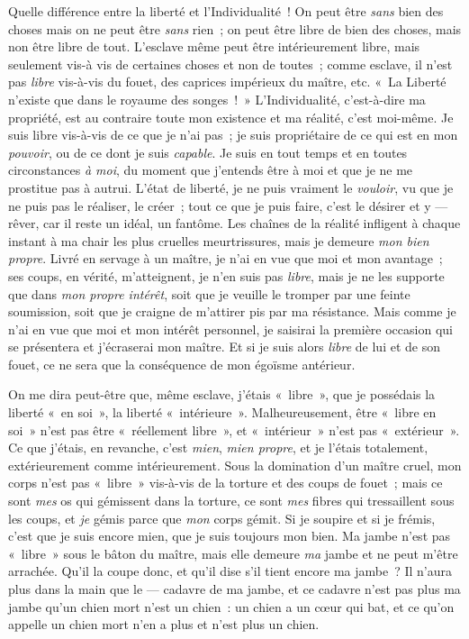 \documentclass[french,twoside]{book} %
\begin{document}
Quelle différence entre la liberté et l’Individualité ! On peut être \emph{sans} bien des choses mais on ne peut être \emph{sans} rien ; on peut être libre de bien des choses,  mais non être libre de tout. L’esclave même peut être intérieurement libre, mais seulement vis-à vis de certaines choses et non de toutes ; comme esclave, il n’est pas \emph{libre} vis-à-vis du fouet, des caprices impérieux du maître, etc. « La Liberté n’existe que dans le royaume des songes ! » L’Individualité, c’est-à-dire ma propriété, est au contraire toute mon existence et ma réalité, c’est moi-même. Je suis libre vis-à-vis de ce que je n’ai pas ; je suis propriétaire de ce qui est en mon \emph{pouvoir}, ou de ce dont je suis \emph{capable}. Je suis en tout temps et en toutes circonstances \emph{à moi}, du moment que j’entends être à moi et que je ne me prostitue pas à autrui. L’état de liberté, je ne puis vraiment le \emph{vouloir}, vu que je ne puis pas le réaliser, le créer ; tout ce que je puis faire, c’est le désirer et y — rêver, car il reste un idéal, un fantôme. Les chaînes de la réalité infligent à chaque instant à ma chair les plus cruelles meurtrissures, mais je demeure \emph{mon bien propre}. Livré en servage à un maître, je n’ai en vue que moi et mon avantage ; ses coups, en vérité, m’atteignent, je n’en suis pas \emph{libre}, mais je ne les supporte que dans \emph{mon propre intérêt}, soit que je veuille le tromper par une feinte soumission, soit que je craigne de m’attirer pis par ma résistance. Mais comme je n’ai en vue que moi et mon intérêt personnel, je saisirai la première occasion qui se présentera et j’écraserai mon maître. Et si je suis alors \emph{libre} de lui et de son fouet, ce ne sera que la conséquence de mon égoïsme antérieur.\par
On me dira peut-être que, même esclave, j’étais « libre », que je possédais la liberté « en soi », la liberté « intérieure ». Malheureusement, être « libre en soi » n’est pas être « réellement libre », et « intérieur » n’est pas « extérieur ». Ce que j’étais, en revanche, c’est \emph{mien}, \emph{mien propre}, et je l’étais totalement, extérieurement comme intérieurement. Sous la domination d’un maître cruel, mon corps n’est pas « libre » vis-à-vis de la torture et des coups de fouet ;  mais ce sont \emph{mes} os qui gémissent dans la torture, ce sont \emph{mes} fibres qui tressaillent sous les coups, et \emph{je }gémis parce que \emph{mon} corps gémit. Si je soupire et si je frémis, c’est que je suis encore mien, que je suis toujours mon bien. Ma jambe n’est pas « libre » sous le bâton du maître, mais elle demeure \emph{ma} jambe et ne peut m’être arrachée. Qu’il la coupe donc, et qu’il dise s’il tient encore ma jambe ? Il n’aura plus dans la main que le — cadavre de ma jambe, et ce cadavre n’est pas plus ma jambe qu’un chien mort n’est un chien : un chien a un cœur qui bat, et ce qu’on appelle un chien mort n’en a plus et n’est plus un chien.\par
\end{document}
